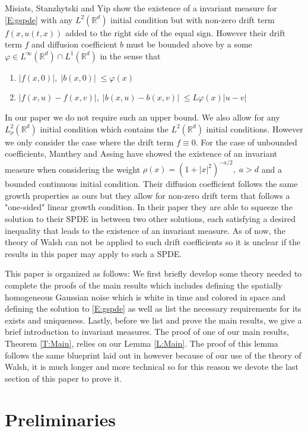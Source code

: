\documentclass[a4paper,11pt]{article}%
\numberwithin{equation}{section}
\theoremstyle{plain}
\theoremstyle{definition}
\newcommand{\R}{\mathbb{R}}
\begin{document}
Misiats, Stanzhytski and Yip \cite{MSY15} show the existence of a invariant measure for \eqref{E:gspde} with any
$L^2(\R^d)$ initial condition but with non-zero drift term $f(x,u(t,x))$ added to the right side of the equal sign.
However their drift term $f$ and diffusion coefficient $b$ must be bounded above by a some $\varphi \in L^\infty(\R^d)
\cap L^1(\R^d)$ in the sense that
\begin{enumerate}
	\item $|f(x,0)|,\; |b(x,0)| \; \le \varphi(x)$
	\item $|f(x,u)-f(x,v)|, \; |b(x,u)-b(x,v)|\; \le L\varphi(x)|u-v|$
\end{enumerate}
In our paper we do not require such an upper bound. We also allow for any $L^2_\rho(\R^d)$ initial condition which
contains the $L^2(\R^d)$ initial conditions. However we only consider the case where the drift term $f \equiv 0$.  For
the case of unbounded coefficients, Manthey and Assing \cite{AM03} have showed the existence of an invariant measure
when considering the weight $\rho(x)=(1+|x|^2)^{-a/2},\; a>d$ and a bounded continuous initial condition. Their
diffusion coefficient follows the same growth properties as ours but they allow for non-zero drift term that follows a
"one-sided" linear growth condition. In their paper they are able to squeeze the solution to their SPDE in between two
other solutions, each satisfying a desired inequality that leads to the existence of an invariant measure. As of now,
the theory of Walsh can not be applied to such drift coefficients so it is unclear if the results in this paper may
apply to such a SPDE.
\bigskip

This paper is organized as follows: We first briefly develop some theory needed to complete the proofs of the main
results which includes defining the spatially homogeneous Gaussian noise which is white in time and colored in space and
defining the solution to \eqref{E:gspde} as well as list the necessary requirements for its exists and uniqueness.
Lastly, before we list and prove the main results, we give a brief introduction to invariant measures. The proof of one
of our main results, Theorem \ref{T:Main}, relies on our Lemma \ref{L:Main}. The proof of this lemma follows the same
blueprint laid out in \cite{TessitoreZabczyk98M} however because of our use of the theory of Walsh, it is much longer
and more technical so for this reason we devote the last section of this paper to prove it.

\section{Preliminaries}
\end{document}

